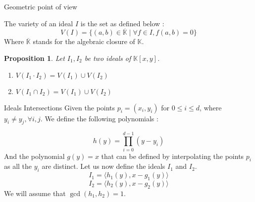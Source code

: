 \documentclass{beamer}
\newtheorem{proposition}{Proposition}[section]
\begin{document}
\begin{frame}{Geometric point of view}
    \begin{definition} 
        The variety of an ideal $I$ is the set as defined below :
        \begin{displaymath}
            V(I) = \{ (a, b) \in \overline{\mathbb{K}} \mid \forall f \in I, f(a, b) = 0 \}
        \end{displaymath}
        Where $\overline{\mathbb{K}}$ stands for the algebraic closure of $\mathbb{K}$.
    \end{definition}
    \begin{proposition}
        Let $I_{1}, I_{2}$ be two ideals of $\mathbb{K}[x, y]$.
        \begin{enumerate}
            \item[(i)] $V(I_{1} \cdot I_{2}) = V(I_{1}) \cup V(I_{2})$
            \item[(ii)] $V(I_{1} \cap I_{2}) = V(I_{1}) \cup V(I_{2})$
        \end{enumerate}
    \end{proposition}
\end{frame}




\begin{frame}{Ideals Intersections}
    Given the points $p_{i} = (x_{i}, y_{i})$ for $0 \leq i \leq d$, where $y_{i} \neq y_{j}, \forall i, j$. 
    We define the following polynomials : 
    
    \begin{displaymath}
        h(y) = \prod_{i=0}^{d-1} (y - y_{i}) 
    \end{displaymath}
    And the polynomial $g(y) = x$ that can be defined by interpolating the points $p_{i}$ as all the $y_{i}$ are distinct.
    Let us now define the ideals $I_{1}$ and $I_{2}$.
    \begin{displaymath}
        I_{1} = \langle h_{1}(y), x - g_{1}(y) \rangle
    \end{displaymath}
    \begin{displaymath}
        I_{2} = \langle h_{2}(y), x - g_{2}(y) \rangle
    \end{displaymath}
    We will assume that $\gcd(h_{1}, h_{2}) = 1$.
\end{frame}
\end{document}
